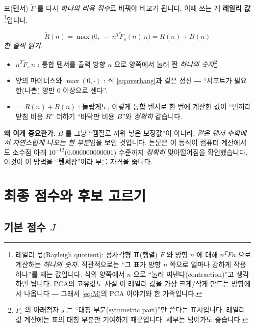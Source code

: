 \documentclass[11pt,a4paper]{article}
\begin{document}
표(텐서) $\tilde F$ 를 다시 \emph{하나의 비용 점수}로 바꿔야 비교가 됩니다. 이때
쓰는 게 \textbf{레일리 값}\footnote{레일리 몫(Rayleigh quotient): 정사각형 표(행렬)
$F$ 와 방향 $n$ 에 대해 $n^{T} F n$ 으로 계산하는 \emph{하나의 숫자}. 직관적으로는
``그 표가 방향 $n$ 쪽으로 얼마나 강하게 작용하나''를 재는 값입니다. 식의 양쪽에서
$n$ 으로 ``눌러 짜낸다(contraction)''고 생각하면 됩니다. PCA의 고유값도 사실 이
레일리 값을 가장 크게/작게 만드는 방향에서 나옵니다 ― 그래서 \eqref{eq:M}의 PCA
이야기와 한 가족입니다.}입니다.

\begin{equation}
\tilde R(n)=\max\!\big(0,\;-\,n^{T}\tilde F_s(n)\,n\big)=R(n)+B(n)
\label{eq:Rtilde}
\end{equation}
\noindent\textit{한 줄씩 읽기.}
\begin{itemize}[leftmargin=1.6em]
\item $n^{T}\tilde F_s\, n$ : 통합 텐서를 출력 방향 $n$ 으로 양쪽에서 눌러 짠
\emph{하나의 숫자}\footnote{$\tilde F_s$ 의 아래첨자 $s$ 는 ``대칭 부분(symmetric
part)''만 쓴다는 표시입니다. 레일리 값 계산에는 표의 대칭 부분만 기여하기 때문입니다.
세부는 넘어가도 좋습니다.}.
\item 앞의 마이너스와 $\max(0,\cdot)$ : 식 \eqref{eq:overhang}과 같은 정신 ―
``서포트가 필요한(나쁜) 양만 0 이상으로 센다''.
\item \textbf{$=R(n)+B(n)$} : 놀랍게도, 이렇게 통합 텐서로 한 번에 계산한 값이
``면끼리 받침 비용 $R$'' 더하기 ``바닥판 비용 $B$''와 \emph{정확히} 같습니다.
\end{itemize}

\begin{notebox}
\textbf{왜 이게 중요한가.} $B$ 를 그냥 ``땜질로 끼워 넣은 보정값''이 아니라,
\emph{같은 텐서 수학에서 자연스럽게 나오는 한 부분}임을 보인 것입니다. 논문은 이
등식이 컴퓨터 계산에서도 소수점 아래 $10^{-12}$(0.000000000001) 수준까지 \emph{정확히}
맞아떨어짐을 확인했습니다. 이것이 이 방법을 ``\textbf{텐서}장''이라 부를 자격을 줍니다.
\end{notebox}

\section{최종 점수와 후보 고르기}

\subsection{기본 점수 \texorpdfstring{$J$}{J}}
\end{document}
